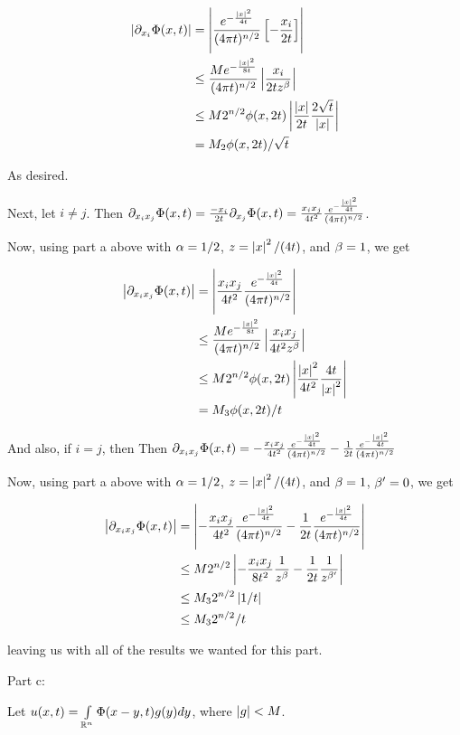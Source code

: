 \documentclass[a4paper,12pt]{article}
\begin{document}
\begin{align*}
\left\lvert \partial_{x_i} \Phi(x,t) \right\rvert &= \left\lvert \frac{e^{-\frac{\left\lvert x \right\rvert^2}{4t}}}{(4 \pi t)^{n/2}}\left[-\frac{x_i}{2t}\right] \right\rvert\\
&\leq \frac{Me^{-\frac{\left\lvert x \right\rvert^2}{8t}}}{(4 \pi t)^{n/2}}\left\lvert \frac{x_i}{2tz^\beta} \right\rvert\\
&\leq M 2^{n/2}\phi(x,2t)\left\lvert \frac{\left\lvert x \right\rvert}{2t} \frac{2\sqrt{t}}{\left\lvert x \right\rvert} \right\rvert\\
&= M_2\phi(x,2t)/\sqrt{t}\\
\end{align*}

As desired. 

Next, let $i \neq j$. Then $\partial_{x_ix_j} \Phi(x,t) = \frac{-x_i}{2t} \partial_{x_j} \Phi(x,t) = \frac{x_ix_j}{4t^2} \frac{e^{-\frac{\left\lvert x \right\rvert^2}{4t}}}{(4 \pi t)^{n/2}}$.

Now, using part a above with $\alpha = 1/2$, $z = \left\lvert x \right\rvert^2/(4t)$, and $\beta = 1$, we get

\begin{align*}
\left\lvert \partial_{x_ix_j} \Phi(x,t) \right\rvert &= \left\lvert \frac{x_ix_j}{4t^2} \frac{e^{-\frac{\left\lvert x \right\rvert^2}{4t}}}{(4 \pi t)^{n/2}} \right\rvert\\
&\leq \frac{Me^{-\frac{\left\lvert x \right\rvert^2}{8t}}}{(4 \pi t)^{n/2}}\left\lvert \frac{x_ix_j}{4t^2z^\beta} \right\rvert\\
&\leq M 2^{n/2}\phi(x,2t)\left\lvert \frac{\left\lvert x \right\rvert^2}{4t^2} \frac{4t}{\left\lvert x \right\rvert^2} \right\rvert\\
&= M_3\phi(x,2t)/t\\
\end{align*}

And also, if $i = j$, then Then $\partial_{x_ix_j} \Phi(x,t) =-\frac{x_ix_j}{4t^2} \frac{e^{-\frac{\left\lvert x \right\rvert^2}{4t}}}{(4 \pi t)^{n/2}} - \frac{1}{2t} \frac{e^{-\frac{\left\lvert x \right\rvert^2}{4t}}}{(4 \pi t)^{n/2}}$

Now, using part a above with $\alpha = 1/2$, $z = \left\lvert x \right\rvert^2/(4t)$, and $\beta = 1$, $\beta'=0$, we get

\begin{align*}
\left\lvert \partial_{x_ix_j} \Phi(x,t) \right\rvert &=\left\lvert -\frac{x_ix_j}{4t^2} \frac{e^{-\frac{\left\lvert x \right\rvert^2}{4t}}}{(4 \pi t)^{n/2}} - \frac{1}{2t} \frac{e^{-\frac{\left\lvert x \right\rvert^2}{4t}}}{(4 \pi t)^{n/2}} \right\rvert\\
&\leq M 2^{n/2}\left\lvert -\frac{x_ix_j}{8t^2} \frac{1}{z^\beta} - \frac{1}{2t} \frac{1}{z^{\beta'}} \right\rvert\\
&\leq M_3 2^{n/2}\left\lvert 1/t \right\rvert\\
&\leq M_3 2^{n/2}/t\\
\end{align*}

leaving us with all of the results we wanted for this part.

\shunt

Part c:

Let $u(x,t) = \int\limits_{\mathbb{R}^n} \Phi(x-y,t) g(y) dy$, where $\left\lvert g \right\rvert < M$. 

\shunt
\end{document}
